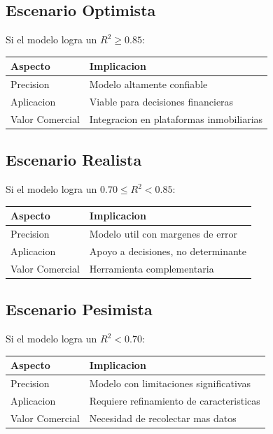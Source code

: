 \documentclass[12pt,a4paper]{article}
\begin{document}
\subsection{Escenario Optimista}
Si el modelo logra un $R^2 \geq 0.85$:

\begin{table}[H]
\centering
\begin{tabular}{|l|l|}
\hline
\textbf{Aspecto} & \textbf{Implicacion} \\
\hline
Precision & Modelo altamente confiable \\
Aplicacion & Viable para decisiones financieras \\
Valor Comercial & Integracion en plataformas inmobiliarias \\
\hline
\end{tabular}
\end{table}

\subsection{Escenario Realista}
Si el modelo logra un $0.70 \leq R^2 < 0.85$:

\begin{table}[H]
\centering
\begin{tabular}{|l|l|}
\hline
\textbf{Aspecto} & \textbf{Implicacion} \\
\hline
Precision & Modelo util con margenes de error \\
Aplicacion & Apoyo a decisiones, no determinante \\
Valor Comercial & Herramienta complementaria \\
\hline
\end{tabular}
\end{table}

\subsection{Escenario Pesimista}
Si el modelo logra un $R^2 < 0.70$:

\begin{table}[H]
\centering
\begin{tabular}{|l|l|}
\hline
\textbf{Aspecto} & \textbf{Implicacion} \\
\hline
Precision & Modelo con limitaciones significativas \\
Aplicacion & Requiere refinamiento de caracteristicas \\
Valor Comercial & Necesidad de recolectar mas datos \\
\hline
\end{tabular}
\end{table}
\end{document}
